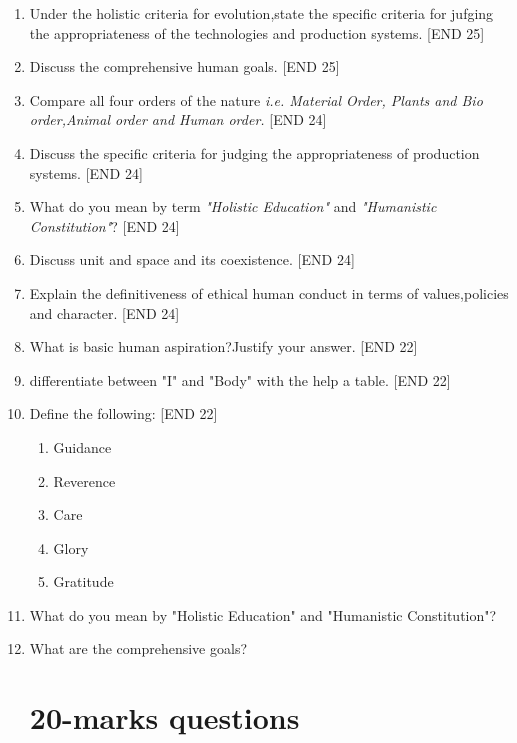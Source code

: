 \documentclass[12pt]{article}
\begin{document}
\begin{enumerate}
		\item Under the holistic criteria for evolution,state the specific criteria for jufging the appropriateness of the technologies and production systems. \hfill{[END 25]}
		
		\item Discuss the comprehensive human goals. \hfill{[END 25]}
		
		
		\item Compare all four orders of the nature \textit{i.e. Material Order, Plants and Bio order,Animal order and Human order.} \hfill{[END 24]}
		
		\item Discuss the specific criteria for judging the appropriateness of production systems. \hfill{[END 24]}
		
		\item What do you mean by term \textit{"Holistic Education"} and \textit{"Humanistic Constitution"}? \hfill{[END 24]}
		
		\item Discuss unit and space and its coexistence. \hfill{[END 24]}
		
		\item Explain the definitiveness of ethical human conduct in terms of values,policies and character. \hfill{[END 24]}
		
		
		\item What is basic human aspiration?Justify your answer. \hfill{[END 22]}
		
		\item differentiate between "I" and "Body" with the help a table. \hfill{[END 22]}
		
		\item Define the following: \hfill{[END 22]}
		\begin{enumerate}
			\item Guidance
			\item Reverence
			\item Care
			\item Glory
			\item Gratitude
		\end{enumerate}
		
		\item What do you mean by "Holistic Education" and "Humanistic Constitution"?
		
		\item What are the comprehensive goals?

		\section{20-marks questions}
		

\end{enumerate}
\end{document}
